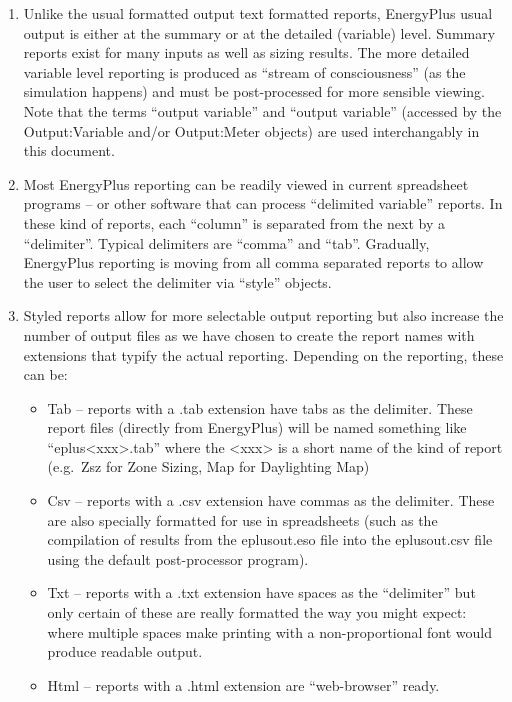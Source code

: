 \begin{enumerate}
  \item
    Unlike the usual formatted output text formatted reports, EnergyPlus usual output is either at the summary or at the detailed (variable) level. Summary reports exist for many inputs as well as sizing results. The more detailed variable level reporting is produced as ``stream of consciousness'' (as the simulation happens) and must be post-processed for more sensible viewing. Note that the terms ``output variable'' and ``output variable'' (accessed by the Output:Variable and/or Output:Meter objects) are used interchangably in this document.
  \item
    Most EnergyPlus reporting can be readily viewed in current spreadsheet programs -- or other software that can process ``delimited variable'' reports. In these kind of reports, each ``column'' is separated from the next by a ``delimiter''. Typical delimiters are ``comma'' and ``tab''. Gradually, EnergyPlus reporting is moving from all comma separated reports to allow the user to select the delimiter via ``style'' objects.
  \item
    Styled reports allow for more selectable output reporting but also increase the number of output files as we have chosen to create the report names with extensions that typify the actual reporting. Depending on the reporting, these can be:
    \begin{itemize}
      \item
        Tab -- reports with a .tab extension have tabs as the delimiter. These report files (directly from EnergyPlus) will be named something like ``eplus\textless{}xxx\textgreater{}.tab'' where the \textless{}xxx\textgreater{} is a short name of the kind of report (e.g.~Zsz for Zone Sizing, Map for Daylighting Map)
      \item
        Csv -- reports with a .csv extension have commas as the delimiter. These are also specially formatted for use in spreadsheets (such as the compilation of results from the eplusout.eso file into the eplusout.csv file using the default post-processor program).
      \item
        Txt -- reports with a .txt extension have spaces as the ``delimiter'' but only certain of these are really formatted the way you might expect: where multiple spaces make printing with a non-proportional font would produce readable output.
      \item
        Html -- reports with a .html extension are ``web-browser'' ready.
    \end{itemize}
\end{enumerate}
